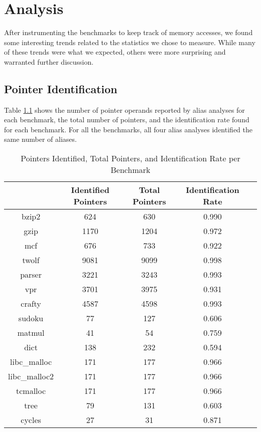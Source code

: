 \chapter{Analysis}

After instrumenting the benchmarks to keep track of memory accesses, we found some interesting trends related to the statistics we chose to measure. While many of these trends were what we expected, others were more surprising and warranted further discussion.

\section{Pointer Identification}
Table \ref{table:1} shows the number of pointer operands reported by alias analyses for each benchmark, the total number of pointers, and the identification rate found for each benchmark. For all the benchmarks, all four alias analyses identified the same number of aliases.

\begin{table} [h!]
\centering
   \begin{tabular} {|c|c c c c|}
      \hline
	   & Identified Pointers & Total Pointers & Identification Rate \\
      \hline
	   bzip2 & 624 & 630 & 0.990 \\
      \hline
	   gzip & 1170 & 1204 & 0.972 \\
      \hline
	   mcf & 676 & 733 & 0.922 \\
      \hline
	   twolf & 9081 & 9099 & 0.998 \\
      \hline
	   parser & 3221 & 3243 & 0.993 \\
      \hline
	   vpr & 3701 & 3975 & 0.931 \\
      \hline
	   crafty & 4587 & 4598 & 0.993 \\
      \hline
	   sudoku & 77 & 127 & 0.606 \\
      \hline
	   matmul & 41 & 54 & 0.759 \\
      \hline
	   dict & 138 & 232 & 0.594 \\
      \hline
	   libc\_malloc & 171 & 177 & 0.966 \\
      \hline
	   libc\_malloc2 & 171 & 177 & 0.966 \\
      \hline
	   tcmalloc & 171 & 177 & 0.966 \\
      \hline
	   tree & 79 & 131 & 0.603 \\
      \hline
	   cycles & 27 & 31 & 0.871 \\
      \hline
   \end{tabular}
   \caption{Pointers Identified, Total Pointers, and Identification Rate per Benchmark}
   \label{table:1}
\end{table}

